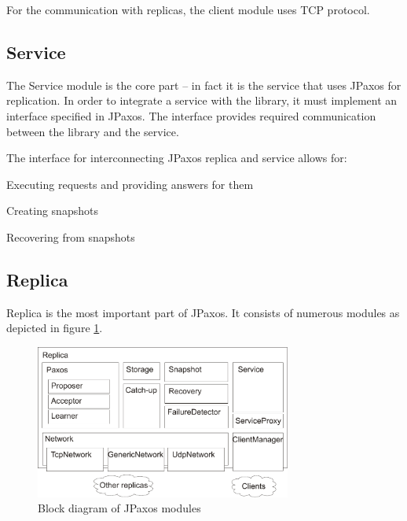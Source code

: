 \noindent For the communication with replicas, the client module uses TCP protocol.

\subsection{Service}


The Service module is the core part -- in fact it is the service that uses JPaxos for replication.
In order to integrate a service with the library, it must implement an interface specified in JPaxos. The interface provides required communication between the library and the service.

The interface for interconnecting JPaxos replica and service allows for:
\begin{tightList}
 \item[\textbullet] Executing requests and providing answers for them
 \item[\textbullet] Creating snapshots
 \item[\textbullet] Recovering from snapshots
\end{tightList}

\subsection{Replica}

Replica is the most important part of JPaxos. It consists of numerous modules as depicted in figure \ref{fig:replica_architecture}.

\begin{figure}[h]
 \centering
 \includegraphics[keepaspectratio, width=0.75\textwidth]{architecture/replica_architecture.pdf}
 \caption{Block diagram of JPaxos modules}
 \label{fig:replica_architecture}
\end{figure}

